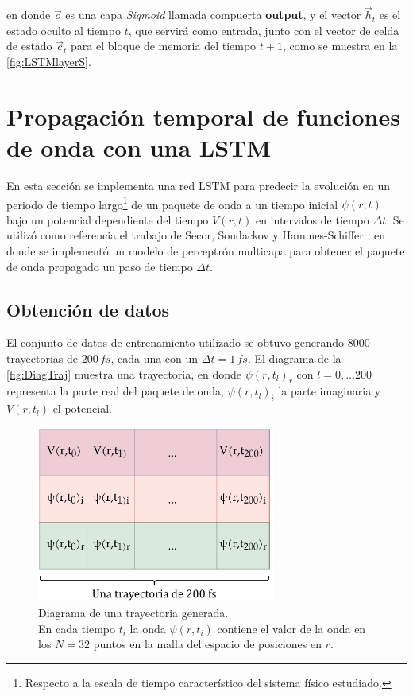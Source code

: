 \noindent en donde $\vec{o}$ es una capa \emph{Sigmoid} llamada compuerta \textbf{output}, y el vector $\vec{h}_t$ es el estado oculto al tiempo $t$, que servirá como entrada, junto con el vector de celda de estado $\vec{c}_t$ para el bloque de memoria del tiempo $t+1$, como se muestra en la \autoref{fig:LSTMlayerS}.


\section{Propagación temporal de funciones de onda con una LSTM}\label{sec:Project}

En esta sección se implementa una red \acs{LSTM} para predecir la evolución en un periodo de tiempo largo\footnote{Respecto a la escala de tiempo característico del sistema físico estudiado.} de un paquete de onda a un tiempo inicial $\psi(r,t)$ bajo un potencial dependiente del tiempo $V(r,t)$ en intervalos de tiempo $\Delta t$. Se utilizó como referencia el trabajo de Secor, Soudackov y Hammes-Schiffer \cite{Main:2021}, en donde se implementó un modelo de perceptrón multicapa para obtener el paquete de onda propagado un paso de tiempo $\Delta t$.

\subsection{Obtención de datos}\label{sec:6.4.1}

El conjunto de datos de entrenamiento utilizado se obtuvo generando 8000 trayectorias de $200\,fs$, cada una con un $\Delta t = 1\,fs$. El diagrama de la \autoref{fig:DiagTraj} muestra una trayectoria, en donde $\psi(r,t_l)_r$ con $l=0,\dots 200$ representa la parte real del paquete de onda, $\psi(r,t_l)_i$ la parte imaginaria y $V(r,t_l)$ el potencial.

\begin{figure}[H]
  \centering
  \includegraphics[width=0.7\textwidth]{./img/DiagTrayectoria.png}
  \caption{Diagrama de una trayectoria generada.\\En cada tiempo $t_i$ la onda $\psi(r,t_i)$ contiene el valor de la onda en los $N=32$ puntos en la malla del espacio de posiciones en $r$.}
  \label{fig:DiagTraj}
\end{figure}

